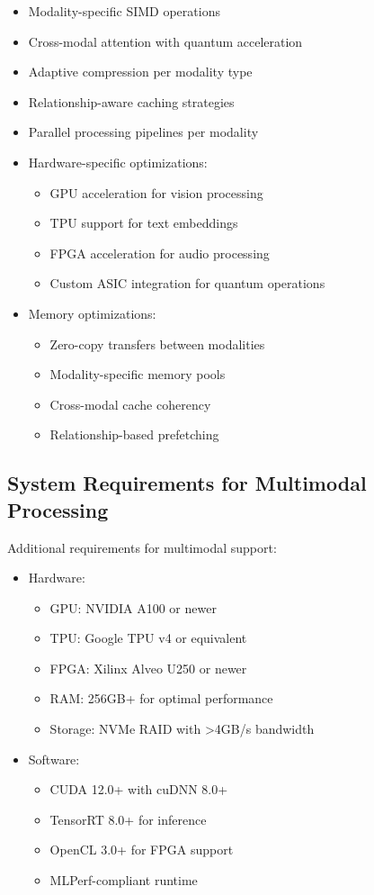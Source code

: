 \documentclass[10pt,twocolumn]{article}
\begin{document}
\begin{itemize}
    \item Modality-specific SIMD operations
    \item Cross-modal attention with quantum acceleration
    \item Adaptive compression per modality type
    \item Relationship-aware caching strategies
    \item Parallel processing pipelines per modality
    \item Hardware-specific optimizations:
        \begin{itemize}
            \item GPU acceleration for vision processing
            \item TPU support for text embeddings
            \item FPGA acceleration for audio processing
            \item Custom ASIC integration for quantum operations
        \end{itemize}
    \item Memory optimizations:
        \begin{itemize}
            \item Zero-copy transfers between modalities
            \item Modality-specific memory pools
            \item Cross-modal cache coherency
            \item Relationship-based prefetching
        \end{itemize}
\end{itemize}

\subsection{System Requirements for Multimodal Processing}
Additional requirements for multimodal support:

\begin{itemize}
    \item Hardware:
        \begin{itemize}
            \item GPU: NVIDIA A100 or newer
            \item TPU: Google TPU v4 or equivalent
            \item FPGA: Xilinx Alveo U250 or newer
            \item RAM: 256GB+ for optimal performance
            \item Storage: NVMe RAID with >4GB/s bandwidth
        \end{itemize}
    \item Software:
        \begin{itemize}
            \item CUDA 12.0+ with cuDNN 8.0+
            \item TensorRT 8.0+ for inference
            \item OpenCL 3.0+ for FPGA support
            \item MLPerf-compliant runtime
        \end{itemize}
\end{itemize}
\end{document}

